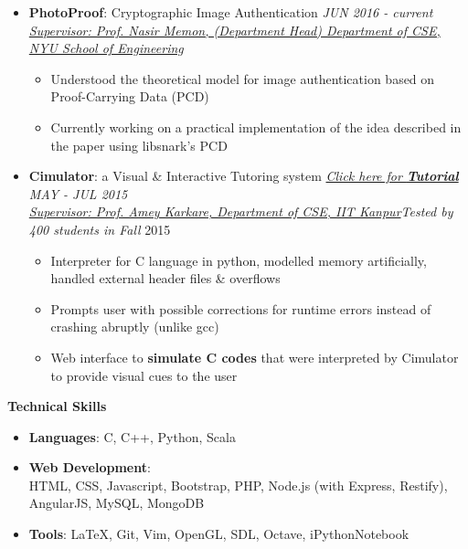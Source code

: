 \documentclass[letterpaper,11pt]{article}
\begin{document}
{\begin{itemize}
    \item \textbf{PhotoProof}: Cryptographic Image Authentication \hfill \textit{JUN 2016 - current}\\
    \href{http://engineering.nyu.edu/people/nasir-memon}{\textit{Supervisor: Prof. Nasir Memon, (Department Head) Department of CSE, NYU School of Engineering}}
    \begin{itemize}
        \item Understood the theoretical model for image authentication based on Proof-Carrying Data (PCD)
        \item Currently working on a practical implementation of the idea described in the paper using libsnark's PCD
    \end{itemize}
    \item \textbf{Cimulator}: a Visual \& Interactive Tutoring system\hspace{0.2in} \href{http://home.iitk.ac.in/~kunalkap/Cimulator.html}{\textit{Click here for \textbf{Tutorial}}} \hfill \textit{MAY - JUL 2015} \\
    \href{http://www.cse.iitk.ac.in/users/karkare/}{\textit{Supervisor: Prof. Amey Karkare, Department of CSE, IIT Kanpur}}\hfill \textit{Tested by 400 students in Fall} 2015\\
        \begin{itemize}
            \item Interpreter for C language in python, modelled memory artificially, handled external header files \& overflows
            \item Prompts user with possible corrections for runtime errors instead of crashing abruptly (unlike gcc)
            \item Web interface to \textbf{simulate C codes} that were interpreted by Cimulator to provide visual cues to the user
        \end{itemize}
\end{itemize}

\Large{\textbf{Technical Skills}}
\small
\vspace{-2pt}
\begin{itemize}
    \item \textbf{Languages}: C, C++, Python, Scala
    \item \textbf{Web Development}:\\
        HTML, CSS, Javascript, Bootstrap, PHP, Node.js (with Express, Restify), AngularJS, MySQL, MongoDB
    \item \textbf{Tools}: \LaTeX, Git, Vim, OpenGL, SDL, Octave, iPythonNotebook
\end{itemize}

}
\end{document}
